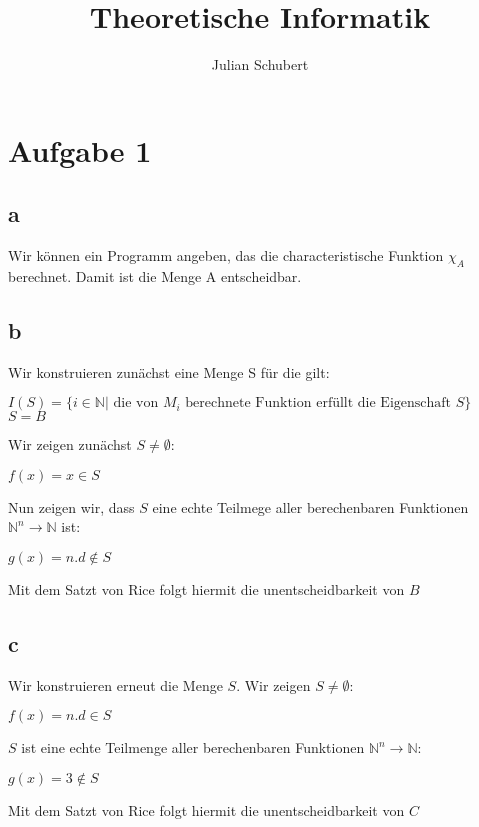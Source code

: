 \documentclass[14pt]{article}
\title{Theoretische Informatik}
\author{Julian Schubert}
\begin{document}
\maketitle
\tableofcontents

\section*{Aufgabe 1}
\subsection*{a}
Wir können ein Programm angeben, das die characteristische Funktion $\chi_A$ berechnet. Damit
ist die Menge A entscheidbar.
\subsection*{b}
Wir konstruieren zunächst eine Menge S für die gilt: \\
\begin{center}
    $I(S) = \{ i \in \mathbb{N} | \text{ die von $M_i$ berechnete Funktion erfüllt die
    Eigenschaft } S\}$ \\
    $S = B$
\end{center}
Wir zeigen zunächst $S \neq \emptyset$:
\begin{center}
    $f(x) = x \in S$
\end{center}
Nun zeigen wir, dass $S$ eine echte Teilmege aller berechenbaren Funktionen $\mathbb{N}^n
\rightarrow \mathbb{N}$ ist:
\begin{center}
    $g(x) = n.d \notin S$
\end{center}
Mit dem Satzt von Rice folgt hiermit die unentscheidbarkeit von $B$
\subsection*{c}
Wir konstruieren erneut die Menge $S$. Wir zeigen $S \neq \emptyset$:
\begin{center}
    $f(x) = n.d \in S$
\end{center}
$S$ ist eine echte Teilmenge aller berechenbaren Funktionen $\mathbb{N}^n
\rightarrow \mathbb{N}$:
\begin{center}
    $g(x) = 3 \notin S$
\end{center}
Mit dem Satzt von Rice folgt hiermit die unentscheidbarkeit von $C$
\end{document}
